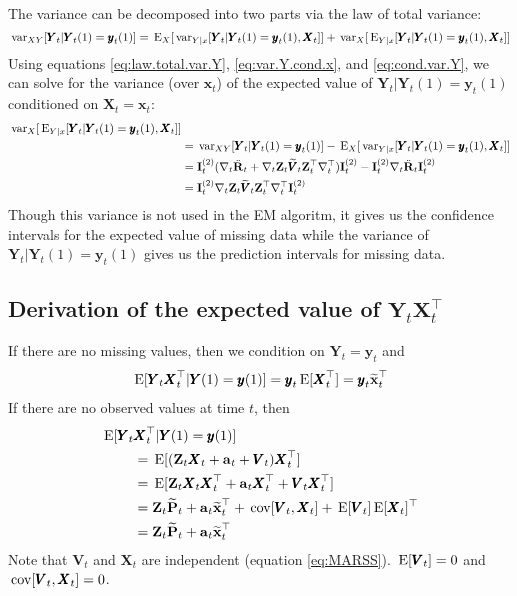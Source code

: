 \documentclass[]{article}
\def\ZZ{\mbox{$\mathbf Z$}}	\def\zz{\mbox{$\mathbf z$}}
\def\IIm{\mbox{$\mathbf I$}}
\def\PP{\mbox{$\mathbf P$}}  \def\pp{\mbox{$\mathbf p$}}
\def\RR{\mbox{$\mathbf R$}}	 \def\rr{\mbox{$\mathbf r$}}
\def\VV{\mbox{$\pmb{V}$}}	\def\vv{\mbox{$\pmb{v}$}}
\def\XX{\mbox{$\pmb{X}$}}	\def\xx{\mbox{$\pmb{x}$}}
\def\YY{\mbox{$\pmb{Y}$}}	\def\yy{\mbox{$\pmb{y}$}}
\def\E{\,\textup{\textrm{E}}}
\def\var{\,\textup{\textrm{var}}}
\def\cov{\,\textup{\textrm{cov}}}
\def\hatxt{\widetilde{\mbox{$\mathbf x$}}_t}
\def\hatPt{\widetilde{\PP}_t}
\def\hatVt{\widetilde{\VV}_t}
\def\IR{\nabla}
\begin{document}
The variance can be decomposed into two parts via the law of total variance:
\begin{equation}\label{eq:law.total.var.Y}
\var_{XY}[\YY_t|\YY_t(1)=\yy_t(1)] = \E_X[\var_{Y|x}[\YY_t|\YY_t(1)=\yy_t(1),\XX_t]] + 
\var_X[\E_{Y|x}[\YY_t|\YY_t(1)=\yy_t(1),\XX_t]]
\end{equation}
Using equations \ref{eq:law.total.var.Y}, \ref{eq:var.Y.cond.x}, and \ref{eq:cond.var.Y}, we can solve for the variance (over $\xx_t$) of the expected value of $\YY_t|\YY_t(1)=\yy_t(1)$ conditioned on $\XX_t=\xx_t$:
\begin{equation}
\begin{split}
\var_X[\E_{Y|x}[\YY_t|\YY_t(1)=\yy_t(1),\XX_t]] & \\
&= \var_{XY}[\YY_t|\YY_t(1)=\yy_t(1)] - \E_X[\var_{Y|x}[\YY_t|\YY_t(1)=\yy_t(1),\XX_t]] \\
&= \IIm_t^{(2)}(\IR_t\ddot{\RR}_t + \IR_t\ZZ_t\hatVt\ZZ_t^\top\IR_t^\top)\IIm_t^{(2)} - \IIm_t^{(2)}\IR_t\ddot{\RR}_t\IIm_t^{(2)} \\
&= \IIm_t^{(2)}\IR_t\ZZ_t\hatVt\ZZ_t^\top\IR_t^\top\IIm_t^{(2)}
\end{split}
\end{equation}
Though this variance is not used in the EM algoritm, it gives us the confidence intervals for the expected value of missing data while the variance of $\YY_t|\YY_t(1)=\yy_t(1)$ gives us the prediction intervals for missing data.

\subsection{Derivation of the expected value of $\YY_t\XX_t^\top$}
If there are no missing values, then we condition on $\YY_t=\yy_t$ and
\begin{equation}
\begin{split}
\E[\YY_t \XX_t^\top|\YY(1)=\yy(1)] = \yy_t\E[\XX_t^\top]=\yy_t\hatxt^\top
\end{split}
\end{equation}
If there are no observed values at time $t$, then 
\begin{equation}
\begin{split}
\E[\YY_t &\XX_t^\top|\YY(1)=\yy(1)]\\ 
&=\E[(\ZZ_t\XX_t+\aa_t+\VV_t)\XX_t^\top]\\
&=\E[\ZZ_t\XX_t\XX_t^\top+\aa_t\XX_t^\top+\VV_t\XX_t^\top]\\
&=\ZZ_t\hatPt+\aa_t\hatxt^\top+\cov[\VV_t,\XX_t]+\E[\VV_t]\E[\XX_t]^\top\\
&=\ZZ_t\hatPt+\aa_t\hatxt^\top
\end{split}
\end{equation}
Note that $\VV_t$ and $\XX_t$ are independent (equation \ref{eq:MARSS}). $\E[\VV_t]=0$ and $\cov[\VV_t,\XX_t]=0$.
\end{document}
